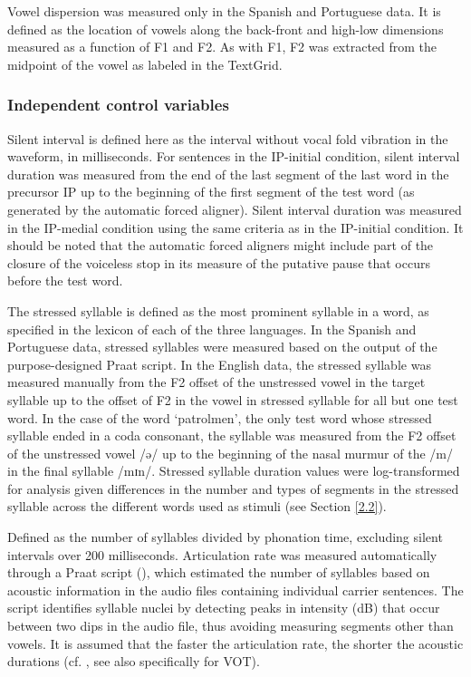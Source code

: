 \documentclass[output=paper]{langscibook}
\begin{document}
Vowel dispersion was measured only in the Spanish and Portuguese data. It is defined as the location of vowels along the back-front and high-low dimensions measured as a function of F1 and F2. As with F1, F2 was extracted from the midpoint of the vowel as labeled in the TextGrid.

\subsubsection{Independent control variables}
Silent interval is defined here as the interval without vocal fold vibration in the waveform, in milliseconds. For sentences in the IP-initial condition, silent interval duration was measured from the end of the last segment of the last word in the precursor IP up to the beginning of the first segment of the test word (as generated by the automatic forced aligner). Silent interval duration was measured in the IP-medial condition using the same criteria as in the IP-initial condition. It should be noted that the automatic forced aligners might include part of the closure of the voiceless stop in its measure of the putative pause that occurs before the test word.

The stressed syllable is defined as the most prominent syllable in a word, as specified in the lexicon of each of the three languages. In the Spanish and Portuguese data, stressed syllables were measured based on the output of the pur\-pose-de\-signed Praat script. In the English data, the stressed syllable was measured manually from the F2 offset of the unstressed vowel in the target syllable up to the offset of F2 in the vowel in stressed syllable for all but one test word. In the case of the word ‘patrolmen’, the only test word whose stressed syllable ended in a coda consonant, the syllable was measured from the F2 offset of the unstressed vowel /ə/ up to the beginning of the nasal murmur of the /m/ in the final syllable /mɪn/. Stressed syllable duration values were log-trans\-formed for analysis given differences in the number and types of segments in the stressed syllable across the different words used as stimuli (see Section \ref{2.2}).

Defined as the number of syllables divided by phonation time, excluding silent intervals over 200 milliseconds. Articulation rate was measured automatically through a Praat script (\citealt{dw09}), which estimated the number of syllables based on acoustic information in the audio files containing individual carrier sentences. The script identifies syllable nuclei by detecting peaks in intensity (dB) that occur between two dips in the audio file, thus avoiding measuring segments other than vowels. It is assumed that the faster the articulation rate, the shorter the acoustic durations (cf. \citealt{fm60, ch88}, see also \citealt{kb98} specifically for VOT). 
\end{document}
